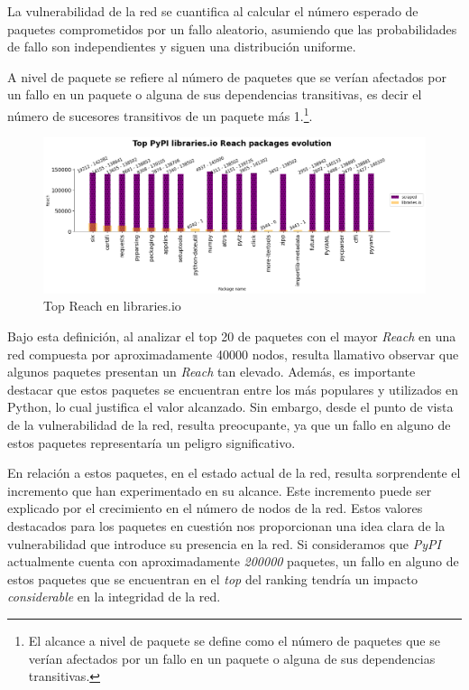 La vulnerabilidad de la red se cuantifica al calcular el número esperado de paquetes comprometidos
por un fallo aleatorio, asumiendo que las probabilidades de fallo son independientes y siguen
una distribución uniforme.

A nivel de paquete se refiere al número de paquetes que se verían afectados por un fallo en un
paquete o alguna de sus dependencias transitivas, es decir el número de sucesores transitivos
de un paquete más 1.\footnote{El alcance a nivel de paquete se
    define como el número de paquetes que se verían afectados por un fallo en un paquete o alguna
    de sus dependencias transitivas.}.


\begin{figure}[h!]
    \begin{center}
        \includegraphics[width=1\textwidth]{img/pypi/top_librariesio_reach_evolution.png}
        \caption{Top Reach en libraries.io}
    \end{center}
\end{figure}


Bajo esta definición, al analizar el top 20 de paquetes con el mayor \textit{Reach} en una red compuesta por aproximadamente 40000 nodos, resulta llamativo observar que algunos paquetes
presentan un \textit{Reach} tan elevado. Además, es importante destacar que estos paquetes se
encuentran entre los más populares y utilizados en Python, lo cual justifica el valor alcanzado.
Sin embargo, desde el punto de vista de la vulnerabilidad de la red, resulta preocupante, ya que
un fallo en alguno de estos paquetes representaría un peligro significativo.

En relación a estos paquetes, en el estado actual de la red, resulta sorprendente el incremento
que han experimentado en su alcance. Este incremento puede ser explicado por el crecimiento en el
número de nodos de la red. Estos valores destacados para los paquetes en cuestión nos proporcionan
una idea clara de la vulnerabilidad que introduce su presencia en la red. Si consideramos que
\textit{PyPI} actualmente cuenta con aproximadamente \textit{200000} paquetes, un fallo en alguno de estos paquetes
que se encuentran en el \textit{top} del ranking tendría un impacto \textit{considerable} en la integridad de la red.


